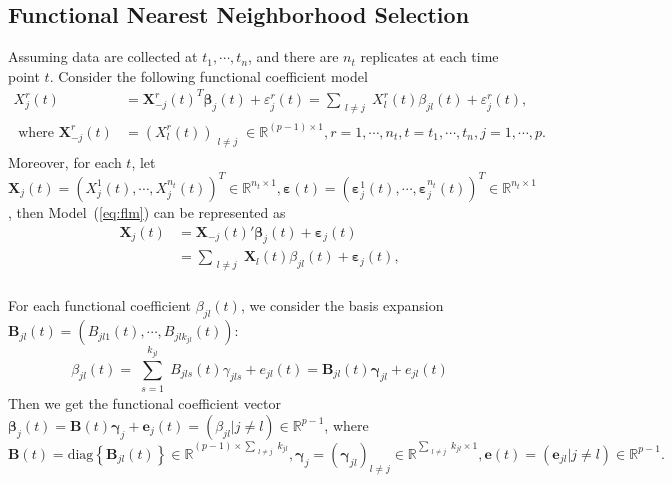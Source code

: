 \documentclass[11pt]{article}
\newcommand{\R}{\mathbb R}
\newcommand{\bX}{\mathbf X}
\newcommand{\bB}{\mathbf B}
\newcommand{\be}{\mathbf e}
\newcommand{\bbeta}{{\boldsymbol{\beta}}}
\newcommand{\bvarepsilon}{\boldsymbol{\varepsilon}}
\newcommand{\bgamma}{\boldsymbol{\gamma}}
\begin{document}
\subsection{Functional Nearest Neighborhood Selection}

Assuming data are collected at $t_1, \cdots, t_n$, and there are $n_t$ replicates at each time point $t$. Consider the following functional coefficient model 
\begin{equation} 
	\label{eq:flm}
    \begin{aligned}
    X_j^r(t) &= {\bX_{-j}^r(t)}^T \bbeta_j(t) + \varepsilon_j^r(t) = \sum_{\substack{l\neq j}} X_l^r(t) \beta_{jl}(t) + \varepsilon_j^r(t),\\
    \text{ where }\bX_{-j}^r(t) &= (X_l^r(t))_{\substack{l \neq j}} \in \R^{(p-1) \times 1}, r = 1, \cdots, n_t, t = t_1, \cdots, t_n, j = 1, \cdots, p.
    \end{aligned}
\end{equation}
Moreover, for each $t$, let $\bX_j(t) = (X_j^1(t), \cdots, X_j^{n_t}(t))^T \in \R^{n_t \times 1}, \bvarepsilon(t) = (\bvarepsilon_j^1(t), \cdots, \bvarepsilon_j^{n_t}(t))^T \in \R^{n_t \times 1}$, then Model~(\ref{eq:flm}) can be represented as
\begin{equation}
	\label{eq:flm1}
	\begin{aligned}
	\bX_j(t) &= {\bX_{-j}(t)}' \bbeta_j(t) + \bvarepsilon_j(t)\\
			 &= \sum_{\substack{l\neq j}} \bX_l(t) \beta_{jl}(t) + \bvarepsilon_j(t),\\
	\end{aligned}
\end{equation}


For each functional coefficient $\beta_{jl}(t)$, we consider the basis expansion $\bB_{jl}(t) = (B_{jl1}(t), \cdots, B_{jlk_{jl}}(t) )$: 
		$$\beta_{jl}(t) = \sum_{\substack{s=1}}^{k_{jl}} B_{jls}(t) \gamma_{jls} + e_{jl}(t) = \bB_{jl}(t) \bgamma_{jl} + e_{jl}(t)$$
Then we get the functional coefficient vector $\bbeta_j(t) = \bB(t) \bgamma_j + \be_j(t) = \left(\beta_{jl}|j \neq l \right) \in \R^{p-1}$, where $\bB(t) = \text{diag}\left\{\bB_{jl}(t)\right\} \in \R^{(p-1)\times \sum_{\substack{l \neq j}}k_{jl} }, \bgamma_j = (\bgamma_{jl})_{l \neq j} \in \R^{\sum_{\substack{l \neq j}}k_{jl} \times 1}, \be(t) = (\be_{jl}|j \neq l) \in \R^{p-1}.$	
\end{document}
